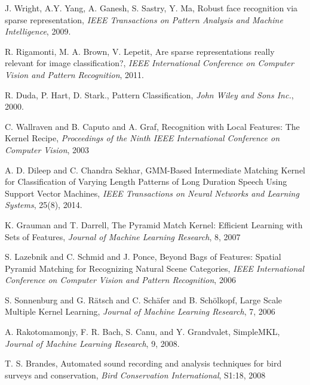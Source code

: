\documentclass{article}
\begin{document}
\begin{thebibliography}{100}
J. Wright, A.Y. Yang, A. Ganesh, S. Sastry, Y. Ma, 
Robust face recognition via sparse representation, 
\emph{IEEE Transactions on Pattern Analysis and Machine Intelligence}, 2009. 

R. Rigamonti, M. A. Brown, V. Lepetit, 
Are sparse representations really relevant for image classification?, 
\emph{IEEE International Conference on Computer Vision and Pattern Recognition},
2011. 

R. Duda, P. Hart, D. Stark., Pattern Classification, 
\emph{John Wiley and Sons Inc.}, 2000. 





C. Wallraven and B. Caputo and A. Graf,
Recognition with Local Features: The Kernel Recipe,
\emph{Proceedings of the Ninth IEEE International Conference on Computer Vision},
2003


A. D. Dileep and C. Chandra Sekhar, 
{GMM}-Based Intermediate Matching Kernel for Classification of Varying Length 
Patterns of Long Duration Speech Using Support Vector Machines, 
\emph{IEEE Transactions on Neural Networks and Learning Systems}, 25(8),
2014. 

K. Grauman and T. Darrell,
The Pyramid Match Kernel: Efficient Learning with Sets of Features,
\emph{Journal of Machine Learning Research},
8, 2007

S. Lazebnik and C. Schmid and J. Ponce,
Beyond Bags of Features: Spatial Pyramid Matching for Recognizing Natural Scene Categories, 
\emph{IEEE International Conference on Computer Vision and Pattern Recognition}, 
2006


S. Sonnenburg and G. R\"{a}tsch and C. Sch\"{a}fer and B. Sch\"{o}lkopf,
Large Scale Multiple Kernel Learning,
\emph{Journal of Machine Learning Research},
 7, 2006

A. Rakotomamonjy, F. R. Bach, S. Canu, and Y. Grandvalet, 
Simple{MKL},
\emph{Journal of Machine Learning Research}, 
9, 2008.













T. S. Brandes,  Automated sound recording and analysis techniques for
bird surveys and conservation, \emph{Bird Conservation International}, S1:18, 2008


\end{thebibliography}
\end{document}
